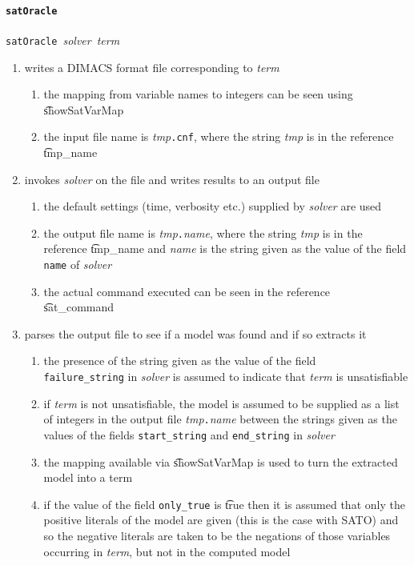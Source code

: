 \paragraph{\tt satOracle}${}$\\
{\small{\tt satOracle}~{\it solver}~{\it term}}


\begin{enumerate}
\item writes a DIMACS format file corresponding to {\it term}
\begin{enumerate}
\item the mapping from \HOL variable names to integers can be seen using
\t{showSatVarMap}
\item the input file name is {\it tmp}{\tt{.cnf}}, where
the string {\it tmp} is in the reference \t{tmp\_name}
\end{enumerate}


\item invokes {\it solver} on the file and writes results to an output file


\begin{enumerate}
\item the default settings (time, verbosity etc.) supplied by {\it solver}
are used
\item the output file name is {\it tmp}{\tt{.}}{\it{name}}, where
the string {\it tmp} is in the reference \t{tmp\_name}
and {\it name} is the string given as the value of the field {\tt name} of {\it solver}
\item the actual command executed can be seen in the reference \\
\t{sat\_command}
\end{enumerate}


\item parses the output file to see if a model was found and if so extracts it

\begin{enumerate}
\item the presence of the string given as the value of the
field \\ {\tt failure\_string} in {\it solver} is
assumed to indicate that {\it term} is unsatisfiable
\item if {\it term} is not unsatisfiable,
the model is assumed to be supplied as a list of integers in the output file 
{\it tmp}{\tt{.}}{\it{name}} between the strings
given as the values of the fields {\tt start\_string} and {\tt end\_string}
in {\it solver}
\item the mapping available via \t{showSatVarMap} is used
to turn the extracted model into a \HOL term
\item if the value of the field {\tt only\_true} is
\t{true} then it is assumed that only the positive literals
of the model are given (this is the case with SATO) and so
the negative literals are taken to be the negations of those variables
occurring in {\it term}, but not in the computed model
\end{enumerate}



\end{enumerate}
